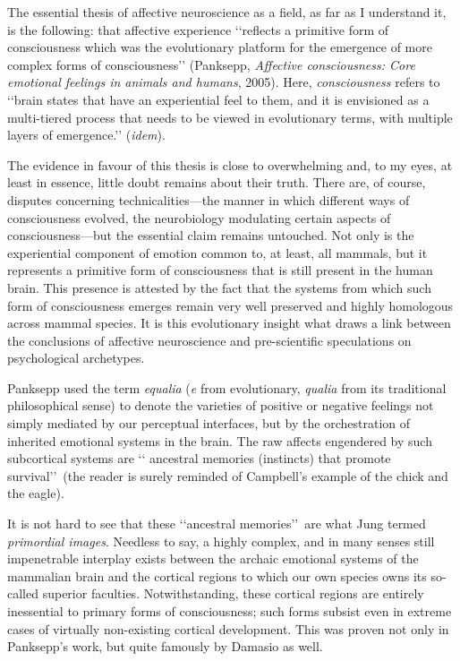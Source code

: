 \documentclass[a4paper]{article}
\begin{document}
The essential thesis of affective neuroscience as a field, as far as I
understand it, is the following: that affective experience \lq\lq reflects a
primitive form of consciousness which was the evolutionary platform for the
emergence of more complex forms of consciousness\rq\rq{} (Panksepp,
\textit{Affective consciousness: Core emotional feelings in animals and humans},
2005). Here, \textit{consciousness} refers to \lq\lq brain states that have an
experiential feel to them, and it is envisioned as a multi-tiered process that
needs to be viewed in evolutionary terms, with multiple layers of
emergence.\rq\rq{} (\textit{idem}). 

The evidence in favour of this thesis is close to overwhelming and, to my eyes,
at least in essence, little doubt remains about their truth. There are, of
course, disputes concerning technicalities---the manner in which different
ways of consciousness evolved, the neurobiology modulating certain aspects of
consciousness---but the essential claim remains untouched. Not only is the
experiential component of emotion common to, at least, all mammals, but it
represents a primitive form of consciousness that is still present in the human
brain. This presence is attested by the fact that the systems from which such
form of consciousness emerges remain very well preserved and highly homologous
across mammal species. It is this evolutionary insight what draws a link between
the conclusions of affective neuroscience and pre-scientific speculations on
psychological archetypes.

Panksepp used the term \textit{equalia} (\textit{e} from evolutionary,
\textit{qualia} from its traditional philosophical sense) to denote the
varieties of positive or negative feelings not simply mediated by our perceptual
interfaces, but by the orchestration of inherited emotional systems in the
brain. The raw affects engendered by such subcortical systems are \lq\lq
ancestral memories (instincts) that promote survival\rq\rq\ (the reader is
surely reminded of Campbell's example of the chick and the eagle).  

It is not hard to see that these \lq\lq ancestral memories\rq\rq\ are what Jung
termed \textit{primordial images}. Needless to say, a highly complex, and in
many senses still impenetrable interplay exists between the archaic emotional
systems of the mammalian brain and the cortical regions to which our own species
owns its so-called superior faculties. Notwithstanding, these cortical
regions are entirely inessential to primary forms of consciousness; such forms
subsist even in extreme cases of virtually non-existing cortical development.
This was proven not only in Panksepp's work, but quite famously by Damasio as
well. 
\end{document}
